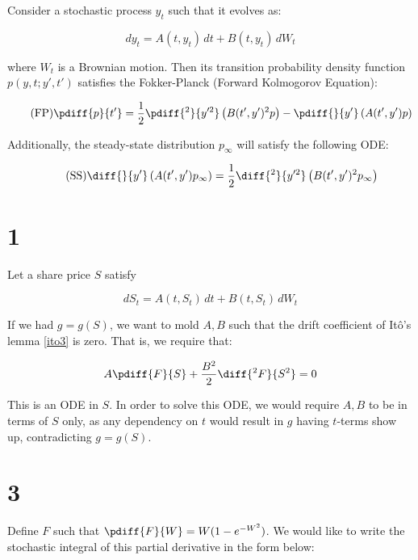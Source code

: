\documentclass{article}
\begin{document}
	\begin{theorem}
		Consider a stochastic process $y_t$ such that it evolves as:
		
		\begin{equation*}
			dy_t = A(t,y_t) \, dt + B(t,y_t) \, dW_t
		\end{equation*}
		
		where $W_t$ is a Brownian motion. Then its transition probability density function $p(y,t;y',t')$ satisfies the Fokker-Planck (Forward Kolmogorov Equation):
		
		\begin{equation}\label{FP}\tag{FP}
			\pdiff{p}{t'} = \frac{1}{2}\pdiff{^2}{y'^2}\left(B(t',y')^2p\right) - \pdiff{}{y'} \left(A(t',y')p\right) 
		\end{equation}
		
		Additionally, the steady-state distribution $p_\infty$ will satisfy the following ODE:
		
		\begin{equation}\label{SS}\tag{SS}
			\diff{}{y'} \left(A(t',y')p_\infty\right) = \frac{1}{2}\diff{^2}{y'^2}\left(B(t',y')^2p_\infty\right)
		\end{equation}
	\end{theorem}
	\section*{1}
	
	Let a share price $S$ satisfy
	
	\begin{equation*}
		dS_t = A(t,S_t) \, dt + B(t,S_t) \, dW_t
	\end{equation*}
	
	If we had $g = g(S)$, we want to mold $A,B$ such that the drift coefficient of It\^o's lemma \ref{ito3} is zero. That is, we require that: 
	
	\begin{equation*}
		A\pdiff{F}{S} + \frac{B^2}{2} \diff{^2F}{S^2} = 0
	\end{equation*}
	
	This is an ODE in $S$. In order to solve this ODE, we would require $A,B$ to be in terms of $S$ only, as any dependency on $t$ would result in $g$ having $t$-terms show up, contradicting $g = g(S)$.
	
	\section*{3}
	Define $F$ such that $\pdiff{F}{W} = W(1-e^{-W^2})$. We would like to write the stochastic integral of this partial derivative in the form below:
	
\end{document}
